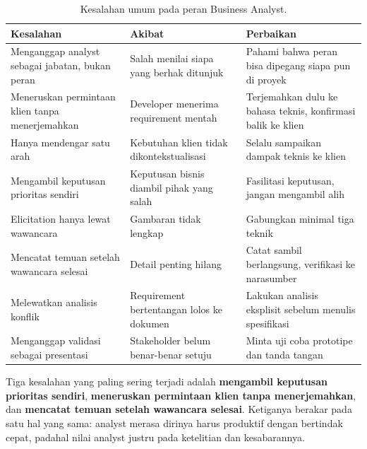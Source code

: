 \documentclass[11pt,a4paper]{article}
\begin{document}
\begin{table}[H]
	\centering
	\caption{Kesalahan umum pada peran Business Analyst.}
	\label{tab:mistakes}
	\footnotesize
	\begin{tabularx}{\textwidth}{l X X}
		\toprule
		Kesalahan                                       & Akibat                                    & Perbaikan                                                    \\
		\midrule
		Menganggap analyst sebagai jabatan, bukan peran & Salah menilai siapa yang berhak ditunjuk  & Pahami bahwa peran bisa dipegang siapa pun di proyek         \\
		Meneruskan permintaan klien tanpa menerjemahkan & Developer menerima requirement mentah     & Terjemahkan dulu ke bahasa teknis, konfirmasi balik ke klien \\
		Hanya mendengar satu arah                       & Kebutuhan klien tidak dikontekstualisasi  & Selalu sampaikan dampak teknis ke klien                      \\
		Mengambil keputusan prioritas sendiri           & Keputusan bisnis diambil pihak yang salah & Fasilitasi keputusan, jangan mengambil alih                  \\
		Elicitation hanya lewat wawancara               & Gambaran tidak lengkap                    & Gabungkan minimal tiga teknik                                \\
		Mencatat temuan setelah wawancara selesai       & Detail penting hilang                     & Catat sambil berlangsung, verifikasi ke narasumber           \\
		Melewatkan analisis konflik                     & Requirement bertentangan lolos ke dokumen & Lakukan analisis eksplisit sebelum menulis spesifikasi       \\
		Menganggap validasi sebagai presentasi          & Stakeholder belum benar-benar setuju      & Minta uji coba prototipe dan tanda tangan                    \\
		\bottomrule
	\end{tabularx}
\end{table}

Tiga kesalahan yang paling sering terjadi adalah \textbf{mengambil keputusan prioritas sendiri}, \textbf{meneruskan permintaan klien tanpa menerjemahkan}, dan \textbf{mencatat temuan setelah wawancara selesai}. Ketiganya berakar pada satu hal yang sama: analyst merasa dirinya harus produktif dengan bertindak cepat, padahal nilai analyst justru pada ketelitian dan kesabarannya.
\end{document}
